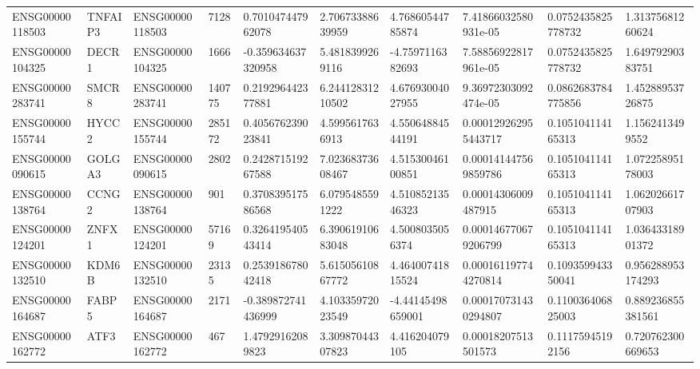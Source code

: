 \begin{tabular}{@{}llllllllll@{}}
ENSG00000118503 & TNFAIP3 & ENSG00000118503 & 7128 & 0.701047447962078 & 2.70673388639959 & 4.76860544785874 & 7.41866032580931e-05 & 0.0752435825778732 & 1.31375681260624 \\
ENSG00000104325 & DECR1 & ENSG00000104325 & 1666 & -0.359634637320958 & 5.4818399269116 & -4.7597116382693 & 7.58856922817961e-05 & 0.0752435825778732 & 1.64979290383751 \\
ENSG00000283741 & SMCR8 & ENSG00000283741 & 140775 & 0.219296442377881 & 6.24412831210502 & 4.67693004027955 & 9.36972303092474e-05 & 0.0862683784775856 & 1.45288953726875 \\
ENSG00000155744 & HYCC2 & ENSG00000155744 & 285172 & 0.405676239023841 & 4.5995617636913 & 4.55064884544191 & 0.000129262955443717 & 0.105104114165313 & 1.1562413499552 \\
ENSG00000090615 & GOLGA3 & ENSG00000090615 & 2802 & 0.242871519267588 & 7.02368373608467 & 4.51530046100851 & 0.000141447569859786 & 0.105104114165313 & 1.07225895178003 \\
ENSG00000138764 & CCNG2 & ENSG00000138764 & 901 & 0.370839517586568 & 6.0795485591222 & 4.51085213546323 & 0.00014306009487915 & 0.105104114165313 & 1.06202661707903 \\
ENSG00000124201 & ZNFX1 & ENSG00000124201 & 57169 & 0.326419540543414 & 6.39061910683048 & 4.5008035056374 & 0.000146770679206799 & 0.105104114165313 & 1.03643318901372 \\
ENSG00000132510 & KDM6B & ENSG00000132510 & 23135 & 0.253918678042418 & 5.61505610867772 & 4.46400741815524 & 0.000161197744270814 & 0.109359943350041 & 0.956288953174293 \\
ENSG00000164687 & FABP5 & ENSG00000164687 & 2171 & -0.389872741436999 & 4.10335972023549 & -4.44145498659001 & 0.000170731430294807 & 0.110036406825003 & 0.889236855381561 \\
ENSG00000162772 & ATF3 & ENSG00000162772 & 467 & 1.47929162089823 & 3.30987044307823 & 4.416204079105 & 0.00018207513501573 & 0.11175945192156 & 0.720762300669653 \\
\bottomrule
\end{tabular}
\endgroup
